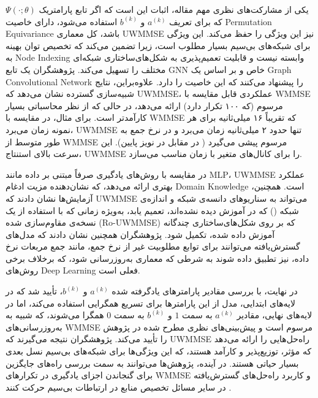 	یکی از مشارکت‌های نظری مهم مقاله، اثبات این است که اگر تابع پارامتریک 
$\Psi(\cdot;\theta)$
	 که برای تعریف
$a^{(k)}$ و $b^{(k)}$
	استفاده می‌شود، دارای خاصیت 
\gls{Permutation Equivariance}
	 باشد، کل معماری 
\gls{UWMMSE}
	  نیز این ویژگی را حفظ می‌کند. این ویژگی برای شبکه‌های بی‌سیم بسیار مطلوب است، زیرا تضمین می‌کند که تخصیص توان بهینه به 
\gls{Node Indexing}
	  وابسته نیست و قابلیت تعمیم‌پذیری به شکل‌های‌ساختاری شبکه‌ای مختلف را تسهیل می‌کند. 
	  پژوهشگران یک تابع 
\gls{GNN}
	   خاص و بر اساس یک 
\gls{Graph Convolutional Network}
	    را پیشنهاد می‌کنند که این خاصیت را دارد.
	علاوه‌براین، نتایج شبیه‌سازی گسترده نشان می‌دهد که 
\gls{UWMMSE}،
	 عملکردی قابل مقایسه با 
\gls{WMMSE}
	  مرسوم (که ۱۰۰ تکرار دارد) ارائه می‌دهد، در حالی که از نظر محاسباتی بسیار کارآمدتر است.
	   برای مثال، در مقایسه با 
\gls{WMMSE}
	    که تقریباً ۱۶ میلی‌ثانیه برای هر نمونه زمان می‌برد، 
\gls{UWMMSE}
	     تنها حدود ۲ میلی‌ثانیه زمان می‌برد و در نرخ جمع به طور متوسط از 
\gls{WMMSE}
	      مرسوم پیشی می‌گیرد (
	      در مقابل 
	      در نویز پایین). این سرعت بالای استنتاج، 
\gls{UWMMSE}
	       را برای کانال‌های متغیر با زمان مناسب می‌سازد.
	       
	        در مقایسه با روش‌های یادگیری صرفاً مبتنی بر داده مانند 
\gls{MLP}، 
\gls{UWMMSE}
	        عملکرد بهتری ارائه می‌دهد، که نشان‌دهنده مزیت ادغام 
\gls{Domain Knowledge}
	         است.
	همچنین، آزمایش‌ها نشان دادند که 
\gls{UWMMSE}
	 می‌تواند به سناریوهای دانسه‌ی شبکه و اندازه‌ی شبکه 
()
 که در آموزش دیده نشده‌اند، تعمیم یابد، به‌ویژه زمانی که با استفاده از یک نسخه‌ی مقاوم‌سازی شده 
(\gls{Ro-UWMMSE})
  که بر روی شکل‌های‌ساختاری چندگانه آموزش داده شده، تکمیل شود. پژوهشگران همچنین نشان دادند که مدل‌های گسترش‌یافته می‌توانند برای توابع مطلوبیت غیر از نرخ جمع، مانند جمع مربعات نرخ داده، نیز تطبیق داده شوند به شرطی که معماری به‌روزرسانی شود، که برخلاف برخی روش‌های 
\gls{Deep Learning}
	فعلی است. 
	
	در نهایت، با بررسی مقادیر پارامترهای یادگرفته شده 
$a^{(k)}$ و $b^{(k)}$،
 تأیید شد که در لایه‌های ابتدایی، مدل از این پارامترها برای تسریع همگرایی استفاده می‌کند، اما در لایه‌های نهایی، مقادیر  
$a^{(k)}$
	به سمت 
$1$
	 و 
$b^{(k)}$
	به سمت 
$0$
	 همگرا می‌شوند، که شبیه به به‌روزرسانی‌های 
\gls{WMMSE}
	  مرسوم است و پیش‌بینی‌های نظری مطرح شده در پژوهش را تأیید می‌کند.
	پژوهشگران نتیجه می‌گیرند که 
\gls{UWMMSE}
	 راه‌حل‌هایی را ارائه می‌دهد که مؤثر، توزیع‌پذیر و کارآمد هستند، که این ویژگی‌ها برای شبکه‌های بی‌سیم نسل بعدی بسیار حیاتی هستند. در آینده، پژوهش‌ها می‌توانند به سمت بررسی راه‌های جایگزین برای گنجاندن اجزای یادگیری در تکرارهای 
\gls{WMMSE}
	  و کاربرد راه‌حل‌های گسترش‌یافته در سایر مسائل تخصیص منابع در ارتباطات بی‌سیم حرکت کنند
\cite{UnfoldingWMMSE}.


